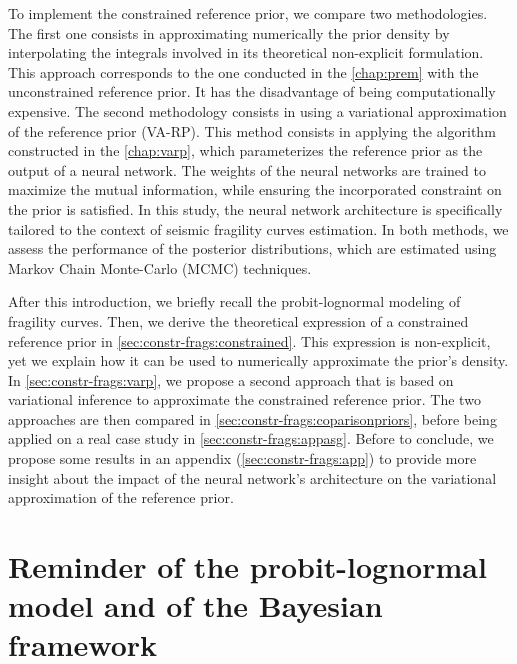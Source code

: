 To implement the constrained reference prior, we compare two methodologies.
The first one consists in approximating numerically the prior density by interpolating the integrals involved in its theoretical non-explicit formulation. %
This approach corresponds to the one conducted in the \cref{chap:prem} with the unconstrained reference prior. It has the disadvantage of being computationally expensive.
The second methodology consists in using a variational approximation of the reference prior (VA-RP).
This method consists in applying the algorithm constructed in the \cref{chap:varp}, which parameterizes the reference prior as the output of a neural network.
The weights of the neural networks are trained to maximize the mutual information, while ensuring the incorporated constraint on the prior is satisfied.
In this study, the neural network architecture is specifically tailored to the context of seismic fragility curves estimation.
In both methods, we assess the performance of the posterior distributions, which are estimated using Markov Chain Monte-Carlo (MCMC) techniques.


After this introduction, we briefly recall the probit-lognormal modeling of %
fragility curves. Then, we derive the theoretical expression of a constrained reference prior in \cref{sec:constr-frags:constrained}.
This expression is non-explicit, yet we explain how it can be used to numerically approximate the prior's density.
In \cref{sec:constr-frags:varp}, we propose a second approach that is based on variational inference to approximate the constrained reference prior.
The two approaches are then compared in \cref{sec:constr-frags:coparisonpriors}, before being applied on a real case study in \cref{sec:constr-frags:appasg}.
Before to conclude, we propose some results in an appendix (\cref{sec:constr-frags:app}) to provide more insight about the impact of the neural network's architecture on the variational approximation of the reference prior.








\section{Reminder of the probit-lognormal model and of the Bayesian framework}\label{sec:constr-frags:model}



